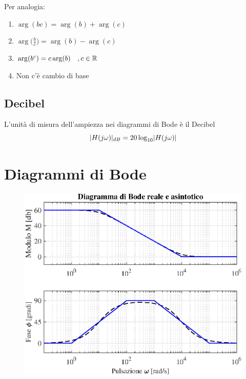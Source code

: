 Per analogia:
\begin{enumerate}
	\item $ \arg ( b c) = \arg (b) + \arg (c) $
	\item $ \arg \Big(\frac{b}{c}\Big) = \arg (b) - \arg (c) $
	\item $ \arg (b^c) = c \arg (b) \quad ,c \in \mathbb{R}$
	\item Non c'è cambio di base
\end{enumerate}

\subsection{Decibel}
L'unità di misura dell'ampiezza nei diagrammi di Bode è il Decibel
\[
\lvert H(j\omega)\rvert_{dB} = 20 \log_{10}\lvert H(j\omega)\rvert
\]


\section{Diagrammi di Bode}
\begin{figure}[H]
	\centering
	\includegraphics[width=0.7\linewidth]{immagini/cap6_Bode/diagBode.eps}
	\label{fig:diagBode}
\end{figure}


